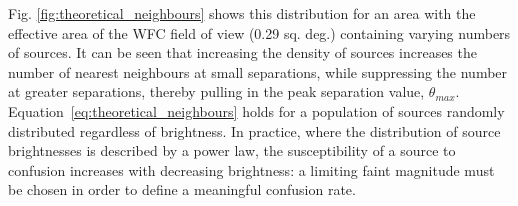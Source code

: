 \documentclass[a4paper,useAMS,usenatbib]{mn2e}
\begin{document}
Fig. \ref{fig:theoretical_neighbours} shows this distribution for an area with the effective area of the WFC field of 
view (0.29 sq. deg.) containing varying numbers of sources. It can be seen that increasing the density of sources 
increases the number of nearest neighbours at small separations, while suppressing the number at greater separations,
thereby pulling in the peak separation value, $\theta_{max}$.  Equation~\ref{eq:theoretical_neighbours} holds for a 
population of sources randomly 
distributed regardless of brightness. In practice, where the distribution of source brightnesses is described by a 
power law, the susceptibility of a source to confusion increases with decreasing brightness: a limiting faint magnitude 
must be chosen in order to define a meaningful confusion rate.



\end{document}
